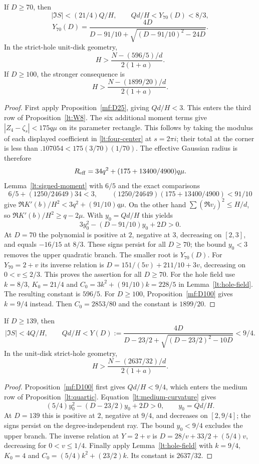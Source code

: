 \begin{proposition}\label{lt:D70}
If $D\ge70$, then
\[
 |\Im S|<(21/4)Q/H,\qquad Qd/H<Y_{70}(D)<8/3,
\]
\[
 Y_{70}(D)=\frac{4D}{D-91/10+\sqrt{(D-91/10)^2-24D}}.
\]
In the strict-hole unit-disk geometry,
\begin{equation}\label{lt:field70}
 H>\frac{N-(596/5)/d}{2(1+a)}.
\end{equation}
If $D\ge100$, the stronger consequence is
\begin{equation}\label{lt:field100}
 H>\frac{N-(1899/20)/d}{2(1+a)}.
\end{equation}
\end{proposition}
\begin{proof}
First apply Proposition~\ref{mf:D25}, giving $Qd/H<3$.
This enters the third row of Proposition~\ref{lt:W8}.
The six additional moment terms give
$|Z_4-\zeta_s|<175q\mu$ on its parameter rectangle.
This follows by taking the modulus of each displayed coefficient in
\eqref{lt:four-center} at $s=2\pi i$; their total at the corner
is less than $.107054<175(3/70)(1/70)$.
The effective Gaussian radius is therefore
\[
 R_{\rm eff}=34q^2+(175+13400/4900)q\mu.
\]
Lemma~\ref{lt:signed-moment} with $6/5$ and the exact comparisons
\[
 6/5+(1250/24649)34<3,\qquad
 (1250/24649)(175+13400/4900)<91/10
\]
give $\Re K'(b)/H^2<3q^2+(91/10)q\mu$.
On the other hand $\sum(\Re v_j)^2\le H/d$, so
$\Re K'(b)/H^2\ge q-2\mu$.
With $y_0=Qd/H$ this yields
\[
 3y_0^2-(D-91/10)y_0+2D>0.
\]
At $D=70$ the polynomial is positive at $2$, negative at $3$,
decreasing on $[2,3]$, and equals $-16/15$ at $8/3$.
These signs persist for all $D\ge70$; the bound $y_0<3$ removes
the upper quadratic branch. The smaller root is $Y_{70}(D)$.
For $Y_{70}=2+v$ its inverse relation is
$D=151/(5v)+211/10+3v$, decreasing on $0<v\le2/3$.
This proves the assertion for all $D\ge70$.
For the hole field use $k=8/3$, $K_0=21/4$ and
$C_0=3k^2+(91/10)k=228/5$ in Lemma~\ref{lt:hole-field}.
The resulting constant is $596/5$. For $D\ge100$,
Proposition~\ref{mf:D100} gives $k=9/4$ instead.
Then $C_0=2853/80$ and the constant is $1899/20$.
\end{proof}

\begin{proposition}\label{lt:medium139}
If $D\ge139$, then
\[
 |\Im S|<4Q/H,\qquad
 Qd/H<Y(D):=\frac{4D}{D-23/2+\sqrt{(D-23/2)^2-10D}}<9/4.
\]
In the unit-disk strict-hole geometry,
\begin{equation}\label{lt:medium-field}
 H>\frac{N-(2637/32)/d}{2(1+a)}.
\end{equation}
\end{proposition}
\begin{proof}
Proposition~\ref{mf:D100} first gives $Qd/H<9/4$, which
enters the medium row of Proposition~\ref{lt:quartic}.
Equation~\eqref{lt:medium-curvature} gives
\[
 (5/4)y_0^2-(D-23/2)y_0+2D>0,\qquad y_0=Qd/H.
\]
At $D=139$ this is positive at $2$, negative at $9/4$, and
decreases on $[2,9/4]$; the signs persist on the degree-independent
ray. The bound $y_0<9/4$ excludes the upper branch. The inverse relation
at $Y=2+v$ is $D=28/v+33/2+(5/4)v$, decreasing for
$0<v\le1/4$. Finally apply Lemma~\ref{lt:hole-field} with
$k=9/4$, $K_0=4$ and $C_0=(5/4)k^2+(23/2)k$.
Its constant is $2637/32$.
\end{proof}

